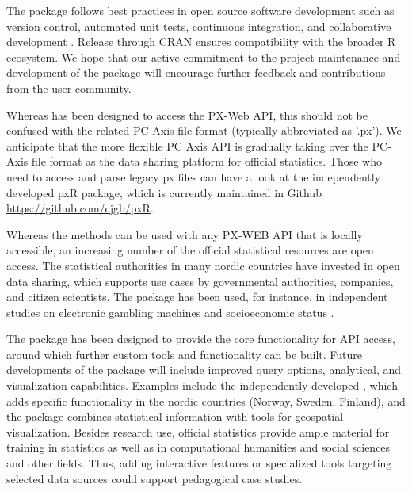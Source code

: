 
The package follows best practices in open source software development
such as version control, automated unit tests, continuous integration,
and collaborative development \citep{PerezRiverol2016}. Release
through CRAN ensures compatibility with the broader R ecosystem. We
hope that our active commitment to the project maintenance and
development of the package will encourage further feedback and
contributions from the user community.


Whereas  has been designed to access the PX-Web API,
this should not be confused with the related PC-Axis file format
(typically abbreviated as '.px'). We anticipate that the more flexible
PC Axis API is gradually taking over the PC-Axis file format as the
data sharing platform for official statistics. Those who need to
access and parse legacy px files can have a look at the independently
developed pxR package, which is currently maintained in
Github \url{https://github.com/cjgb/pxR}.


Whereas the methods can be used with any PX-WEB API that is locally
accessible, an increasing number of the official statistical resources
are open access. The statistical authorities in many nordic countries
have invested in open data sharing, which supports use cases by
governmental authorities, companies, and citizen scientists. The
package has been used, for instance, in independent studies on
electronic gambling machines and socioeconomic
status \cite{Raisamo2019}. %


The  package has been designed to provide the core
functionality for API access, around which further custom tools and
functionality can be built. Future developments of the package will
include improved query options, analytical, and visualization
capabilities. Examples include the independently
developed , which adds specific functionality in
the nordic countries (Norway, Sweden, Finland), and the
 package combines statistical information with tools for
geospatial visualization. Besides research use, official statistics
provide ample material for training in statistics as well as in
computational humanities and social sciences and other fields. Thus,
adding interactive features or specialized tools targeting selected
data sources could support pedagogical case studies.

